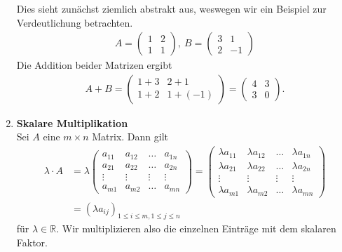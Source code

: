 \begin{enumerate}
Dies sieht zunächst ziemlich abstrakt aus, weswegen wir ein Beispiel zur Verdeutlichung betrachten.
\begin{align*}
A = 
\begin{pmatrix}
1 & 2\\
1 & 1
\end{pmatrix}, \
B =
\begin{pmatrix}
3 & 1 \\
2 & -1
\end{pmatrix}
\end{align*} 
Die Addition beider Matrizen ergibt
\begin{align*}
A+B 
=
\begin{pmatrix}
1+3 & 2 +1\\
1 +2 & 1+(-1)
\end{pmatrix}
=
\begin{pmatrix}
4 & 3\\
3 & 0
\end{pmatrix}.
\end{align*}

\item \textbf{Skalare Multiplikation}\vspace{0.2cm}\\
Sei $A$ eine $m \times n$ Matrix.
Dann gilt
\begin{align*}
\lambda \cdot A
&=
\lambda
\begin{pmatrix}
a_{11} & a_{12} & \dots & a_{1n}\\
a_{21} & a_{22} & \dots & a_{2n}\\
\vdots & \vdots & \vdots & \vdots\\
a_{m1} & a_{m2} & \hdots & a_{mn}
\end{pmatrix}
=
\begin{pmatrix}
\lambda a_{11} & \lambda a_{12} & \dots &\lambda a_{1n}\\
\lambda a_{21} &\lambda a_{22} & \dots &\lambda a_{2n}\\
\vdots & \vdots & \vdots & \vdots\\
\lambda a_{m1} &\lambda a_{m2} & \hdots &\lambda a_{mn}
\end{pmatrix}\\
&=(\lambda a_{ij})_{1 \leq i \leq m,1 \leq j \leq n}
\end{align*}
für $\lambda \in \mathbb{R}$.
Wir multiplizieren also die einzelnen Einträge mit dem skalaren Faktor.


\end{enumerate}
